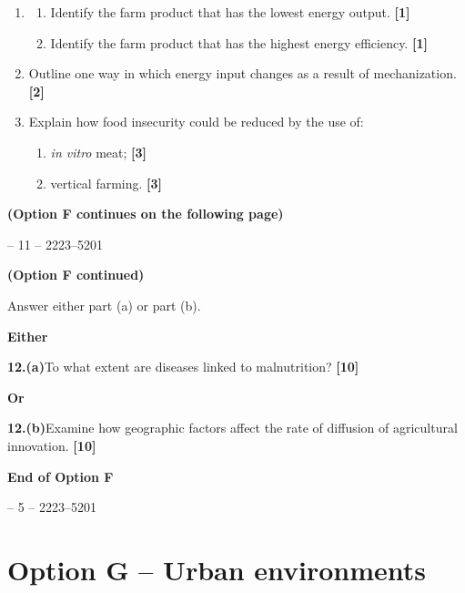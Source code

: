 \documentclass[11pt,a4paper]{article}
\newcommand{\markpts}[1]{\hfill\textbf{[#1]}}
\newcommand{\sourcepage}[2]{%
  \begin{center}
    {\sffamily\small -- #1 -- \hfill #2}
  \end{center}
}
\begin{document}
\begin{enumerate}[label=(\alph*),leftmargin=2.2em,itemsep=0.35em,topsep=0.25em]
  \item
  \begin{enumerate}[label=(\roman*),leftmargin=2.8em,itemsep=0.2em,topsep=0.15em]
    \item Identify the farm product that has the lowest energy output.
    \markpts{1}

    \item Identify the farm product that has the highest energy efficiency.
    \markpts{1}
  \end{enumerate}

  \item Outline one way in which energy input changes as a result of
  mechanization. \markpts{2}

  \item Explain how food insecurity could be reduced by the use of:
  \begin{enumerate}[label=(\roman*),leftmargin=2.8em,itemsep=0.2em,topsep=0.15em]
    \item \emph{in vitro} meat; \markpts{3}

    \item vertical farming. \markpts{3}
  \end{enumerate}
\end{enumerate}

\textbf{(Option F continues on the following page)}

\newpage

\sourcepage{11}{2223--5201}

\textbf{(Option F continued)}

Answer either part (a) or part (b).

\textbf{Either}

\textbf{12.}\quad \textbf{(a)}\quad To what extent are diseases linked to
malnutrition? \markpts{10}

\textbf{Or}

\textbf{12.}\quad \textbf{(b)}\quad Examine how geographic factors affect the
rate of diffusion of agricultural innovation. \markpts{10}

\vfill

\begin{center}
  {\sffamily\bfseries\Large End of Option F}
\end{center}

\sourcepage{5}{2223--5201}

\section*{Option G -- Urban environments}
\end{document}
